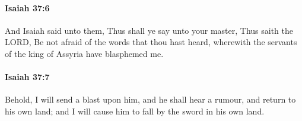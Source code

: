 		\paragraph{Isaiah 37:6} %
			\label{ISAIAH-37-6}

			And Isaiah said unto them, Thus shall ye say unto your master, Thus saith the LORD, Be not afraid of the words that thou hast heard, wherewith the servants of the king of Assyria have blasphemed me.


		\paragraph{Isaiah 37:7} %
			\label{ISAIAH-37-7}

			Behold, I will send a blast upon him, and he shall hear a rumour, and return to his own land; and I will cause him to fall by the sword in his own land.


